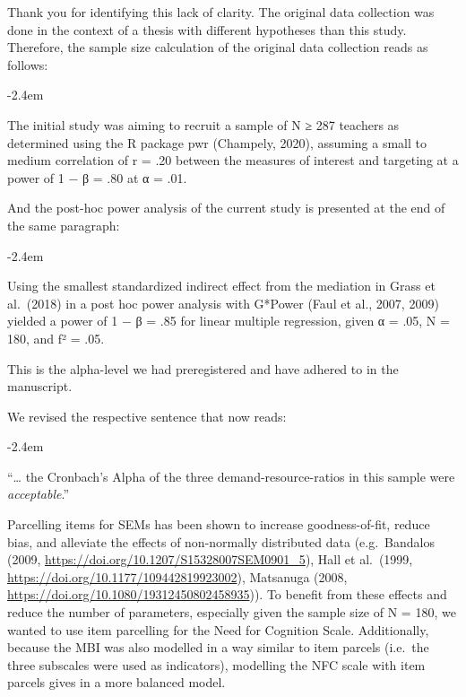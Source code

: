 \documentclass[draft]{article}
\renewenvironment{quote}{\begin{fquote}\advance\leftmargini -2.4em\begin{oldquote}}{\end{oldquote}\end{fquote}}
\newenvironment{fquote}
  {\def\FrameCommand{
	\fboxsep=0.6em %
	\fcolorbox{black}{white}}%
    \MakeFramed {\advance\hsize-2\width \FrameRestore}
    \begin{minipage}{\linewidth}
  }
  {\end{minipage}\endMakeFramed}
\begin{document}

Thank you for identifying this lack of clarity.
The original data collection was done in the context of a thesis with different hypotheses than this study.
Therefore, the sample size calculation of the original data collection reads as follows:

\begin{quote}
The initial study was aiming to recruit a sample of N ≥ 287 teachers as determined using the R package pwr (Champely, 2020), assuming a small to medium correlation of r = .20 between the measures of interest and targeting at a power of 1 − β = .80 at α = .01.
\end{quote}

And the post-hoc power analysis of the current study is presented at the end of the same paragraph:

\begin{quote}
Using the smallest standardized indirect effect from the mediation in Grass et al.~(2018) in a post hoc power analysis with G*Power (Faul et al., 2007, 2009) yielded a power of 1 − β = .85 for linear multiple regression, given α = .05, N = 180, and f² = .05.
\end{quote}

This is the alpha-level we had preregistered and have adhered to in the manuscript.


We revised the respective sentence that now reads:

\begin{quote}
``\ldots{} the Cronbach's Alpha of the three demand-resource-ratios in this sample were \emph{acceptable}.''
\end{quote}


Parcelling items for SEMs has been shown to increase goodness-of-fit, reduce bias, and alleviate the effects of non-normally distributed data (e.g.~Bandalos (2009, \url{https://doi.org/10.1207/S15328007SEM0901_5}), Hall et al.~(1999, \url{https://doi.org/10.1177/109442819923002}), Matsanuga (2008, \url{https://doi.org/10.1080/19312450802458935})).
To benefit from these effects and reduce the number of parameters, especially given the sample size of N = 180, we wanted to use item parcelling for the Need for Cognition Scale.
Additionally, because the MBI was also modelled in a way similar to item parcels (i.e.~the three subscales were used as indicators), modelling the NFC scale with item parcels gives in a more balanced model.
\end{document}
